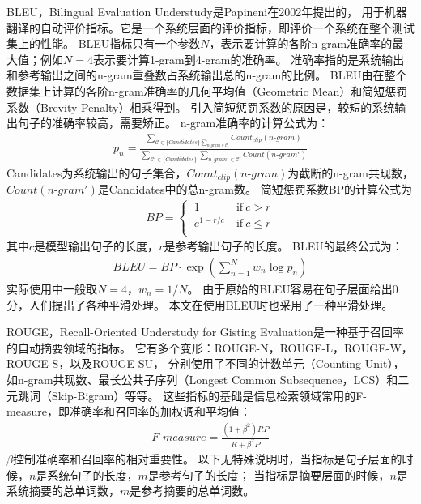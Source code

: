 BLEU，Bilingual Evaluation Understudy是Papineni在2002年提出的，
用于机器翻译的自动评价指标。它是一个系统层面的评价指标，即评价一个系统在整个测试集上的性能。
BLEU指标只有一个参数$N$，表示要计算的各阶n-gram准确率的最大值；例如$N = 4$表示要计算1-gram到4-gram的准确率。
准确率指的是系统输出和参考输出之间的n-gram重叠数占系统输出总的n-gram的比例。
BLEU由在整个数据集上计算的各阶n-gram准确率的几何平均值（Geometric Mean）和简短惩罚系数（Brevity Penalty）相乘得到。
引入简短惩罚系数的原因是，较短的系统输出句子的准确率较高，需要矫正。
n-gram准确率的计算公式为：
\begin{align}
    p_n = \frac{
    \sum_{\mathcal{C} \in \{\textit{Candidates}\}
    \sum_{\textit{n-gram} \in \mathcal{C}}}
    \textit{Count}_{\textit{clip}}(\textit{n-gram})
    }{
    \sum_{\mathcal{C'} \in \{\textit{Candidates}\}}
    \sum_{\textit{n-gram}' \in \mathcal{C'}}
    \textit{Count}(\textit{n-gram}')
    }
\end{align}
Candidates为系统输出的句子集合，$\textit{Count}_{\textit{clip}}(\textit{n-gram})$为截断的n-gram共现数，
$\textit{Count}(\textit{n-gram}')$是Candidates中的总n-gram数。
简短惩罚系数BP的计算公式为
\begin{align}
    \textit{BP} =
    \begin{cases}
        \ 1 \ & \text{if} \  c > r \\
        \ e^{1 - r/c} \ & \text{if} \  c \leq r \\
    \end{cases}
\end{align}
其中$c$是模型输出句子的长度，$r$是参考输出句子的长度。
BLEU的最终公式为：
\begin{align}
    \textit{BLEU} = \textit{BP} \cdot \exp \left( \sum_{n=1}^N w_n \log p_n \right)
\end{align}
实际使用中一般取$N = 4$，$w_n = 1 / N$。
由于原始的BLEU容易在句子层面给出0分，人们提出了各种平滑处理。
本文在使用BLEU时也采用了一种平滑处理。

ROUGE，Recall-Oriented Understudy for Gisting Evaluation是一种基于召回率的自动摘要领域的指标。
它有多个变形：ROUGE-N，ROUGE-L，ROUGE-W，ROUGE-S，以及ROUGE-SU，
分别使用了不同的计数单元（Counting Unit），如n-gram共现数、最长公共子序列（Longest Common Subsequence，LCS）和二元跳词（Skip-Bigram）等等。
这些指标的基础是信息检索领域常用的F-measure，即准确率和召回率的加权调和平均值：
\begin{align}
    \textit{F-measure} = \frac{(1 + \beta^2) RP}{R + \beta^2 P}
\end{align}
$\beta$控制准确率和召回率的相对重要性。
以下无特殊说明时，当指标是句子层面的时候，$n$是系统句子的长度，$m$是参考句子的长度；
当指标是摘要层面的时候，$n$是系统摘要的总单词数，$m$是参考摘要的总单词数。

